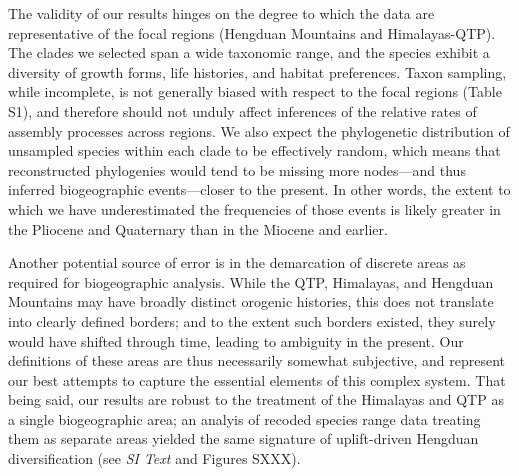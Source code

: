 The validity of our results hinges on the degree to which the data are
representative of the focal regions (Hengduan Mountains and
Himalayas-QTP). The clades we selected span a wide taxonomic range,
and the species exhibit a diversity of growth forms, life histories,
and habitat preferences. Taxon sampling, while incomplete, is not
generally biased with respect to the focal regions (Table S1), and
therefore should not unduly affect inferences of the relative rates of
assembly processes across regions. We also expect the phylogenetic
distribution of unsampled species within each clade to be effectively
random, which means that reconstructed phylogenies would tend to be
missing more nodes---and thus inferred biogeographic events---closer
to the present. In other words, the extent to which we have
underestimated the frequencies of those events is likely greater in
the Pliocene and Quaternary than in the Miocene and earlier.

Another potential source of error is in the demarcation of discrete
areas as required for biogeographic analysis. While the QTP,
Himalayas, and Hengduan Mountains may have broadly distinct orogenic
histories, this does not translate into clearly defined borders; and
to the extent such borders existed, they surely would have shifted
through time, leading to ambiguity in the present. Our definitions of
these areas are thus necessarily somewhat subjective, and represent
our best attempts to capture the essential elements of this complex
system. That being said, our results are robust to the treatment of
the Himalayas and QTP as a single biogeographic area; an analyis of
recoded species range data treating them as separate areas yielded the
same signature of uplift-driven Hengduan diversification (see
\textit{SI Text} and Figures SXXX).




